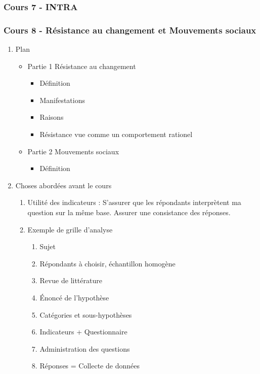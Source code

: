 \documentclass[11pt]{article}
\begin{document}
\subsubsection{Cours 7 - INTRA}
\label{sec:orga9159d0}
\subsubsection{Cours 8 - Résistance au changement et Mouvements sociaux}
\label{sec:org913120c}

\begin{enumerate}
\item Plan
\label{sec:org6f299e3}
\begin{itemize}
\item Partie 1 Résistance au changement
\begin{itemize}
\item Définition
\item Manifestations
\item Raisons
\item Résistance vue comme un comportement rationel
\end{itemize}
\item Partie 2 Mouvements sociaux
\begin{itemize}
\item Définition
\end{itemize}
\end{itemize}

\item Choses abordées avant le cours
\label{sec:orgc7cfccc}
\begin{enumerate}
\item Utilité des indicateurs :
\label{sec:orgac674b1}
S'assurer que les répondants interprètent ma question sur la même base.  Assurer
une consistance des réponses.
\item Exemple de grille d'analyse
\label{sec:org4c45363}

\begin{enumerate}
\item Sujet
\item Répondants à choisir, échantillon homogène
\item Revue de littérature
\item Énoncé de l'hypothèse
\item Catégories et sous-hypothèses
\item Indicateurs + Questionnaire
\item Administration des questions
\item Réponses = Collecte de données
\end{enumerate}


\end{enumerate}
\end{enumerate}
\end{document}
